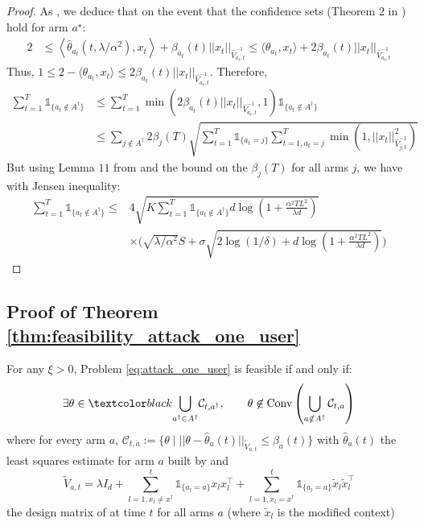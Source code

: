 \begin{proof}
As , we deduce that on the event that the confidence sets (Theorem $2$ in \cite{abbasi2011improved}) hold for arm $a^{\star}$: 
\begin{align*}
    2&\leq\left\langle \hat{\theta}_{a_{t}}(t, \lambda/\alpha^{2}), x_{t} \right\rangle +  \beta_{a_{t}}(t)||x_{t}||_{\hat{V}_{a_{t},t}^{-1}}\leq \langle\theta_{a_{t}}, x_{t}\rangle+2\beta_{a_{t}}(t)||x_{t}||_{\hat{V}_{a_{t},t}^{-1}}
\end{align*}
Thus, $1 \leq 2 - \langle\theta_{a_{t}}, x_{t}\rangle \leq 2\beta_{a_{t}}(t)||x_{t}||_{\hat{V}_{a_{t},t}^{-1}}$. Therefore,
\begin{align*}
    \sum_{t=1}^{T} \mathds{1}_{\{a_{t}\notin A^{\dagger}\}} &\leq \sum_{t=1}^{T} \min(2\beta_{a_{t}}(t)||x_{t}||_{\hat{V}_{a_{t},t}^{-1}},1)\mathds{1}_{\{a_{t} \notin A^{\dagger}\}}\\
    &\leq \sum_{j\notin A^{\dagger}} 2\beta_{j}(T)\sqrt{\sum_{t=1}^{T}\mathds{1}_{\{a_{t}=j\}}\sum_{t=1, a_{t}=j}^{T} \min(1, ||x_{t}||^{2}_{\hat{V}_{j,t}^{-1}})}&
  \end{align*}
  But using Lemma $11$ from \cite{abbasi2011improved} and the bound on the $\beta_{j}(T)$ for all arms $j$, we have with Jensen inequality:
  \begin{align*}
    \sum_{t=1}^{T} \mathds{1}_{\{a_{t}\notin A^{\dagger}\}} \leq &4\sqrt{K\sum_{t=1}^{T} \mathds{1}_{\{a_{t}\notin A^{\dagger}\}}d\log\left(1 + \frac{\alpha^2TL^2}{\lambda d}\right)}\\
    &\times\Big( \sqrt{\lambda/\alpha^{2}} S + \sigma\sqrt{2\log(1/\delta) + d\log(1 + \frac{\alpha^2TL^2}{\lambda d})}\Big)
\end{align*}
\end{proof}



\subsection{Proof of Theorem \ref{thm:feasibility_attack_one_user}}\label{app:feasibility_attack_one_user}

\begin{thm*}
For any $\xi>0$, Problem \eqref{eq:attack_one_user} is feasible if and only if:
\begin{align}\label{eq:feasibilty_condition_bis}
\exists \theta \in  \changelm{\bigcup_{a^\dagger\in A^{\dagger}}}\mathcal{C}_{t, a^{\dagger}}, \qquad \theta\not\in \text{Conv}\left( \bigcup_{a\notin A^{\dagger}} \mathcal{C}_{t,a}\right)
\end{align}
	where for every arm $a$,  $\mathcal{C}_{t,a} := \big\{\theta \mid ||\theta - \hat{\theta}_{a}(t)||_{\tilde{V}_{a,t}} \leq \beta_{a}(t) \big\}$ with $\hat{\theta}_{a}(t)$ the least squares estimate for arm $a$ built by \linucb and 
	$$\tilde{V}_{a,t} = \lambda I_{d} + \sum_{l=1, x_{l}\neq x^{\dagger}}^{t} \mathds{1}_{\{a_{l} = a\}}x_{l}x_{l}^{\intercal} + \sum_{l=1, x_{l}= x^{\dagger}}^{t} \mathds{1}_{\{a_{l} = a\}}\tilde{x}_{l}\tilde{x}_{l}^{\intercal} $$ 
	the design matrix of \linucb at time $t$ for all arms $a$ (where $\tilde{x}_{l}$ is the modified context)
\end{thm*}


